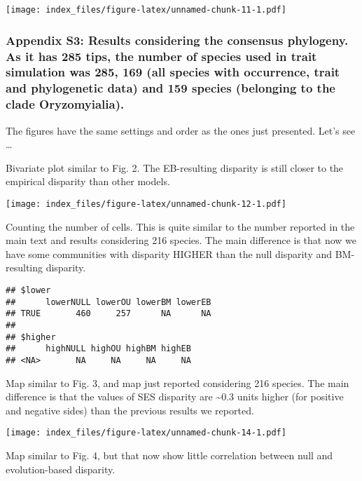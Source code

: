 \documentclass[
]{article}
\begin{document}
\texttt{[image: index\_files/figure-latex/unnamed-chunk-11-1.pdf]}

\hypertarget{appendix-s3-results-considering-the-consensus-phylogeny.-as-it-has-285-tips-the-number-of-species-used-in-trait-simulation-was-285-169-all-species-with-occurrence-trait-and-phylogenetic-data-and-159-species-belonging-to-the-clade-oryzomyialia.}{%
\subsubsection{Appendix S3: Results considering the consensus phylogeny.
As it has 285 tips, the number of species used in trait simulation was
285, 169 (all species with occurrence, trait and phylogenetic data) and
159 species (belonging to the clade
Oryzomyialia).}\label{appendix-s3-results-considering-the-consensus-phylogeny.-as-it-has-285-tips-the-number-of-species-used-in-trait-simulation-was-285-169-all-species-with-occurrence-trait-and-phylogenetic-data-and-159-species-belonging-to-the-clade-oryzomyialia.}}

The figures have the same settings and order as the ones just presented.
Let's see \ldots{}

Bivariate plot similar to Fig. 2. The EB-resulting disparity is still
closer to the empirical disparity than other models.

\texttt{[image: index\_files/figure-latex/unnamed-chunk-12-1.pdf]}

Counting the number of cells. This is quite similar to the number
reported in the main text and results considering 216 species. The main
difference is that now we have some communities with disparity HIGHER
than the null disparity and BM-resulting disparity.

\begin{verbatim}
## $lower
##      lowerNULL lowerOU lowerBM lowerEB
## TRUE       460     257      NA      NA
## 
## $higher
##      highNULL highOU highBM highEB
## <NA>       NA     NA     NA     NA
\end{verbatim}

Map similar to Fig. 3, and map just reported considering 216 species.
The main difference is that the values of SES disparity are
\textasciitilde0.3 units higher (for positive and negative sides) than
the previous results we reported.

\texttt{[image: index\_files/figure-latex/unnamed-chunk-14-1.pdf]}

Map similar to Fig. 4, but that now show little correlation between null
and evolution-based disparity.
\end{document}
